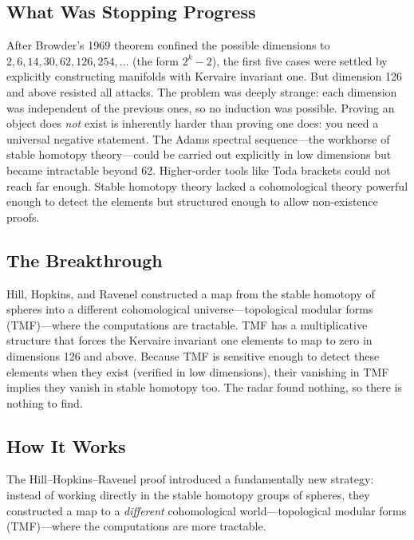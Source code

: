 \subsection{What Was Stopping Progress}

After Browder's 1969 theorem confined the possible dimensions to $2, 6, 14, 30, 62, 126, 254, \ldots$ (the form $2^k - 2$), the first five cases were settled by explicitly constructing manifolds with Kervaire invariant one. But dimension 126 and above resisted all attacks. The problem was deeply strange: each dimension was independent of the previous ones, so no induction was possible. Proving an object does \emph{not} exist is inherently harder than proving one does: you need a universal negative statement. The Adams spectral sequence---the workhorse of stable homotopy theory---could be carried out explicitly in low dimensions but became intractable beyond 62. Higher-order tools like Toda brackets could not reach far enough. Stable homotopy theory lacked a cohomological theory powerful enough to detect the elements but structured enough to allow non-existence proofs.

\subsection{The Breakthrough}

Hill, Hopkins, and Ravenel constructed a map from the stable homotopy of spheres into a different cohomological universe---topological modular forms (TMF)---where the computations are tractable. TMF has a multiplicative structure that forces the Kervaire invariant one elements to map to zero in dimensions 126 and above. Because TMF is sensitive enough to detect these elements when they exist (verified in low dimensions), their vanishing in TMF implies they vanish in stable homotopy too. The radar found nothing, so there is nothing to find.

\subsection{How It Works}

The Hill--Hopkins--Ravenel proof introduced a fundamentally new strategy: instead of working directly in the stable homotopy groups of spheres, they constructed a map to a \emph{different} cohomological world---topological modular forms (TMF)---where the computations are more tractable.


